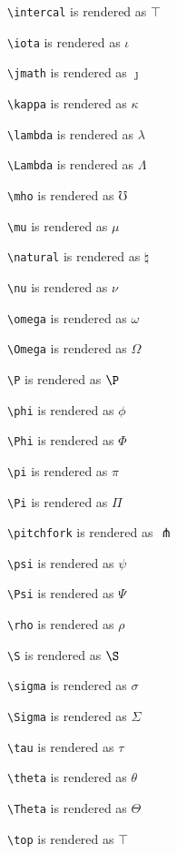 \texttt{\textbackslash intercal} is rendered as $\intercal$


\texttt{\textbackslash iota} is rendered as $\iota$


\texttt{\textbackslash jmath} is rendered as $\jmath$


\texttt{\textbackslash kappa} is rendered as $\kappa$


\texttt{\textbackslash lambda} is rendered as $\lambda$


\texttt{\textbackslash Lambda} is rendered as $\Lambda$


\texttt{\textbackslash mho} is rendered as $\mho$


\texttt{\textbackslash mu} is rendered as $\mu$


\texttt{\textbackslash natural} is rendered as $\natural$


\texttt{\textbackslash nu} is rendered as $\nu$


\texttt{\textbackslash omega} is rendered as $\omega$


\texttt{\textbackslash Omega} is rendered as $\Omega$


\texttt{\textbackslash P} is rendered as $\P$


\texttt{\textbackslash phi} is rendered as $\phi$


\texttt{\textbackslash Phi} is rendered as $\Phi$


\texttt{\textbackslash pi} is rendered as $\pi$


\texttt{\textbackslash Pi} is rendered as $\Pi$


\texttt{\textbackslash pitchfork} is rendered as $\pitchfork$


\texttt{\textbackslash psi} is rendered as $\psi$


\texttt{\textbackslash Psi} is rendered as $\Psi$


\texttt{\textbackslash rho} is rendered as $\rho$


\texttt{\textbackslash S} is rendered as $\S$


\texttt{\textbackslash sigma} is rendered as $\sigma$


\texttt{\textbackslash Sigma} is rendered as $\Sigma$


\texttt{\textbackslash tau} is rendered as $\tau$


\texttt{\textbackslash theta} is rendered as $\theta$


\texttt{\textbackslash Theta} is rendered as $\Theta$


\texttt{\textbackslash top} is rendered as $\top$



